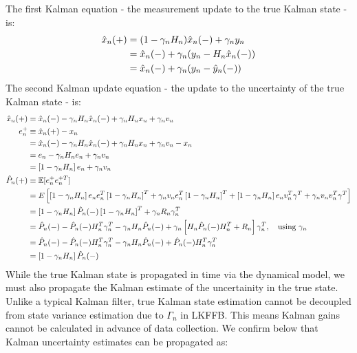 The first Kalman equation - the measurement update to the true Kalman state - is:
\begin{align}
\hat{x}_{n}(+) &= (1 - \gamma_nH_n) \hat{x}_{n}(-) + \gamma_ny_n \\
& =  \hat{x}_{n}(-) + \gamma_n(y_n - H_n\hat{x}_{n}(-)) \\
&= \hat{x}_{n}(-) + \gamma_n (y_n - \hat{y}_n(-)) \label{eqn:KF_update_x+} 
\end{align}
 The second Kalman update equation - the  update to the uncertainty of the true Kalman state - is:
\begin{align}
\hat{x}_{n}(+) &=  \hat{x}_{n}(-) - \gamma_nH_n \hat{x}_{n}(-) + \gamma_nH_n x_n + \gamma_nv_n  \\
e^{+}_n &\equiv \hat{x}_{n}(+) - x_n \\
&=  \hat{x}_{n}(-) - \gamma_nH_n \hat{x}_{n}(-) + \gamma_nH_n x_n + \gamma_nv_n - x_n \nonumber \\
 &=  e_n - \gamma_nH_n e_n + \gamma_nv_n \\
& = \left[1 - \gamma_nH_n \right] e_n + \gamma_nv_n  \\
\hat{P}_{n}(+) &\equiv \mathbb{E}[e_n^+ e_n^{+T}] \\
& = E \left[ \left[1 - \gamma_nH_n \right] e_n e_n^T \left[1 - \gamma_nH_n \right]^T + \gamma_nv_n e_n^T \left[1 - \gamma_nH_n \right]^T   +  \left[1 - \gamma_nH_n \right] e_n v_n^T \gamma^T + \gamma_nv_n v_n^T \gamma^T \right] \\
& = \left[1 - \gamma_n H_n \right] \hat{P}_{n}(-)\left[1 - \gamma_n H_n \right]^T + \gamma_n R_n \gamma_n^T  \\
& =  \hat{P}_{n}(-) - \hat{P}_{n}(-)H_n^T\gamma_n^T - \gamma_n H_n \hat{P}_{n}(-) + \gamma_n \left[ H_n \hat{P}_{n}(-)H_n^T +  R_n \right] \gamma_n^T, \quad \text{using $\gamma_n$}\\
&= \hat{P}_{n}(-) - \hat{P}_{n}(-)H_n^T\gamma_n^T - \gamma_n H_n \hat{P}_{n}(-) +  \hat{P}_{n}(-)H_n^T \gamma_n^T  \\ 
&= \left[1  - \gamma_n H_n \right] \hat{P}_{n}(-) \label{eqn:KF_update_p+}
\end{align}
While the true Kalman state is propagated in time via the dynamical model, we must also propagate the Kalman estimate of the uncertainity in the true state. Unlike a typical Kalman filter, true Kalman state estimation cannot be decoupled from state variance estimation due to $\Gamma_n$ in LKFFB. This means Kalman gains cannot be calculated in advance of data collection. We confirm below that Kalman uncertainty estimates can be propagated as:

